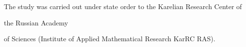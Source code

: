 

















\Ack





\vspace*{-3pt}








     \noindent


     The study was carried out under state order to the Karelian Research Center of 


the Russian Academy


of Sciences (Institute of Applied Mathematical Research KarRC RAS).





\pagebreak








